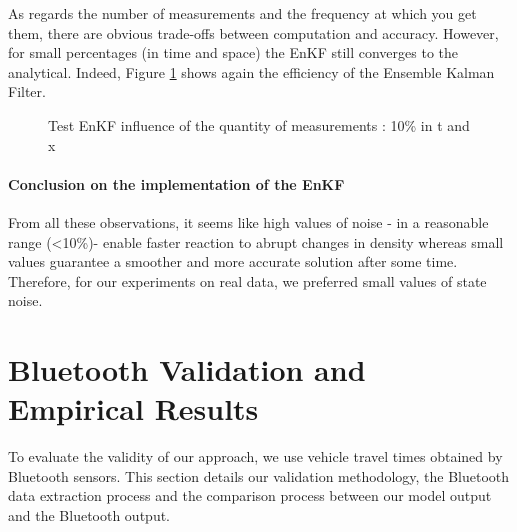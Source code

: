 \documentclass[letterpaper,10pt]{article}
\begin{document}
 As regards the number of measurements and the frequency at which you get them, there are obvious trade-offs between computation and accuracy. However, for small percentages (in time and space) the EnKF still converges to the analytical. Indeed, Figure \ref{influence_change_percent} shows again the efficiency of the Ensemble Kalman Filter.
 
 \begin{figure}
  \centering
  \caption{Test EnKF influence of the quantity of measurements : 10\% in t and x}\label{influence_change_percent}
 \end{figure}
 
\paragraph{Conclusion on the implementation of the EnKF}
From all these observations, it seems like high values of noise - in a reasonable range (<10\%)- enable faster reaction to abrupt changes in density whereas small values guarantee a smoother and more accurate solution after some time. Therefore, for our experiments on real data, we preferred small values of state noise.

\newpage
\section{Bluetooth Validation and Empirical Results \label{sec:val}}
To evaluate the validity of our approach, we use vehicle travel times obtained by Bluetooth sensors. This section details our validation methodology, the Bluetooth data extraction process and the comparison process between our model output and the Bluetooth output.
\end{document}
